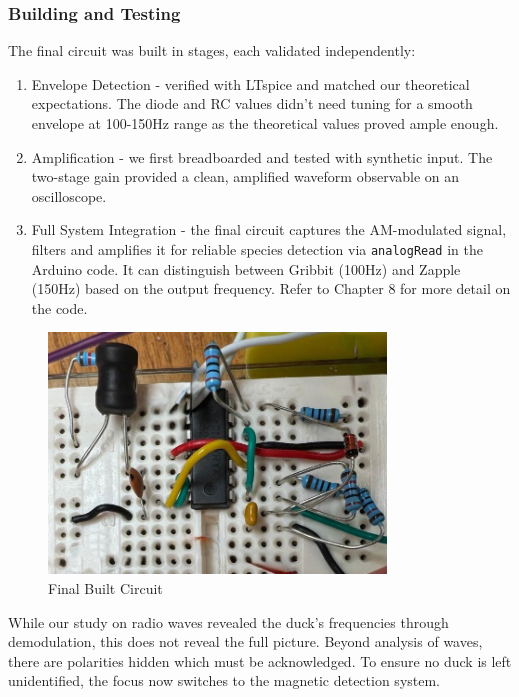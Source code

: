 \subsubsection{Building and Testing}

The final circuit was built in stages, each validated independently:

\begin{enumerate}
    \item  Envelope Detection - verified with LTspice and matched our theoretical expectations. The diode and RC values didn't need tuning for a smooth envelope at 100-150Hz range as the theoretical values proved ample enough.
    \item Amplification - we first breadboarded and tested with synthetic input. The two-stage gain provided a clean, amplified waveform observable on an oscilloscope.
    \item Full System Integration - the final circuit captures the AM-modulated signal, filters and amplifies it for reliable species detection via \texttt{analogRead} in the Arduino code. It can distinguish between Gribbit (100Hz) and Zapple (150Hz) based on the output frequency. Refer to Chapter 8 for more detail on the code.
\end{enumerate}

\begin{figure}[H]
    \centering
    \includegraphics[width=0.8\textwidth]{subpages/images/radio_circuit.jpg}
    \caption{Final Built Circuit}
    \label{fig:radio_circuit}
\end{figure}

While our study on radio waves revealed the duck's frequencies through demodulation, this does not reveal the full picture. Beyond analysis of waves, there are polarities hidden which must be acknowledged. To ensure no duck is left unidentified, the focus now switches to the magnetic detection system.
